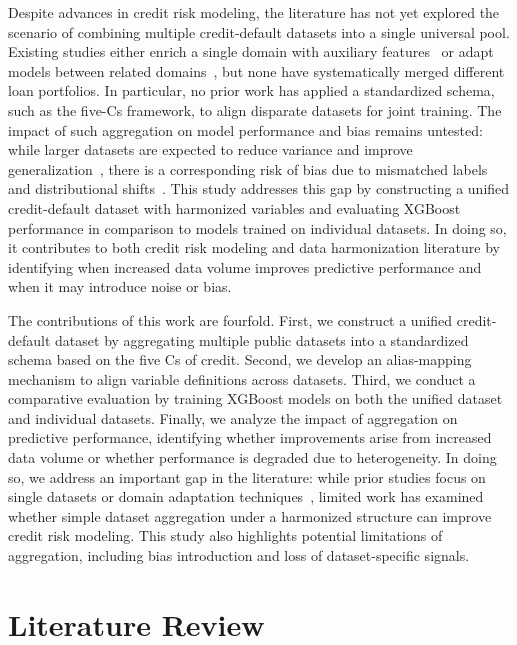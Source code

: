 \documentclass[onecolumn]{IEEEtai}
\begin{document}
Despite advances in credit risk modeling, the literature has not yet explored the scenario of combining multiple credit-default datasets into a single universal pool. Existing studies either enrich a single domain with auxiliary features~\cite{2} or adapt models between related domains~\cite{4}, but none have systematically merged different loan portfolios. In particular, no prior work has applied a standardized schema, such as the five-Cs framework, to align disparate datasets for joint training. The impact of such aggregation on model performance and bias remains untested: while larger datasets are expected to reduce variance and improve generalization~\cite{1,8,23,24}, there is a corresponding risk of bias due to mismatched labels and distributional shifts~\cite{4,5}. This study addresses this gap by constructing a unified credit-default dataset with harmonized variables and evaluating XGBoost performance in comparison to models trained on individual datasets. In doing so, it contributes to both credit risk modeling and data harmonization literature by identifying when increased data volume improves predictive performance and when it may introduce noise or bias.

The contributions of this work are fourfold. First, we construct a unified credit-default dataset by aggregating multiple public datasets into a standardized schema based on the five Cs of credit. Second, we develop an alias-mapping mechanism to align variable definitions across datasets. Third, we conduct a comparative evaluation by training XGBoost models on both the unified dataset and individual datasets. Finally, we analyze the impact of aggregation on predictive performance, identifying whether improvements arise from increased data volume or whether performance is degraded due to heterogeneity. In doing so, we address an important gap in the literature: while prior studies focus on single datasets or domain adaptation techniques~\cite{4,11,16,20}, limited work has examined whether simple dataset aggregation under a harmonized structure can improve credit risk modeling. This study also highlights potential limitations of aggregation, including bias introduction and loss of dataset-specific signals.



\section{Literature Review}
\end{document}
